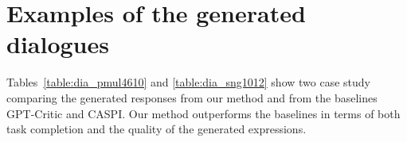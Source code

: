 \section{Examples of the generated dialogues} \label{sec:appendix_example}

Tables~\ref{table:dia_pmul4610} and \ref{table:dia_sng1012} show two case study comparing the generated responses from our method and from the baselines GPT-Critic and CASPI.
Our method outperforms the baselines in terms of both task completion and the quality of the generated expressions.

\begin{table}[H]
\captionsetup{font=small}
\caption{
Generated and original dialogue for ID PMUL4610.
``User" denotes User Utterance. ``System" denotes true System Response.
\textcolor{Maroon}{Red} annotations explain unsatisfactory responses and \textcolor{SeaGreen}{green} for satisfactory ones.
} 
\label{table:dia_pmul4610}
\centering 
{}
\end{table}
